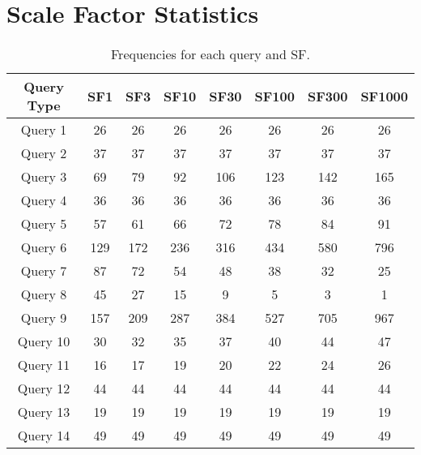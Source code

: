 \section{Scale Factor Statistics}\label{appendix:scale_factors}

\begin{table}[H]
\centering
\begin{tabular}{|c|c|c|c|c|c|c|c|}
   \hline
   \textbf{Query Type} & \textbf{SF1} & \textbf{SF3}& \textbf{SF10} & \textbf{SF30} & \textbf{SF100} & \textbf{SF300} & \textbf{SF1000} \\ 
   \hline
   \hline
   Query 1 & 26  & 26  & 26  & 26  & 26  & 26  & 26 \\ 
   \hline                                           
   Query 2 & 37  & 37  & 37  & 37  & 37  & 37  & 37 \\  
   \hline                                           
   Query 3 & 69  & 79  & 92  & 106 & 123 & 142 & 165\\ 
   \hline                                           
   Query 4 & 36  & 36  & 36  & 36  & 36  & 36  & 36 \\ 
   \hline                                           
   Query 5 & 57  & 61  & 66  & 72  & 78  & 84  & 91 \\ 
   \hline                                           
   Query 6 & 129 & 172 & 236 & 316 & 434 & 580 & 796\\  
   \hline                                           
   Query 7 & 87 & 72   & 54  & 48  & 38  & 32  & 25 \\ 
   \hline
   Query 8 & 45 &  27  & 15  & 9   & 5   & 3   & 1  \\ 
   \hline                                           
   Query 9 & 157 & 209 & 287 & 384 & 527 & 705 & 967\\  
   \hline                                           
   Query 10 & 30 & 32  & 35  & 37  & 40  & 44  & 47 \\ 
   \hline                                           
   Query 11 & 16 & 17  & 19  & 20  & 22  & 24  & 26 \\ 
   \hline                                           
   Query 12 & 44 & 44  & 44  & 44  & 44  & 44  & 44 \\ 
   \hline                                           
   Query 13 & 19 & 19  & 19  & 19  & 19  & 19  & 19 \\  
   \hline                                           
   Query 14 & 49 & 49  & 49  & 49  & 49  & 49  & 49 \\ 
   \hline
   \end{tabular}
   \caption{Frequencies for each query and SF.}
   \label{table:freqs_sf1}
\end{table}

